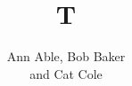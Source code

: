 \documentclass{article}
\begin{document}
\title{T}
\author{{Ann Able, Bob Baker} \\
{and Cat Cole}}
\maketitle
\end{document}
